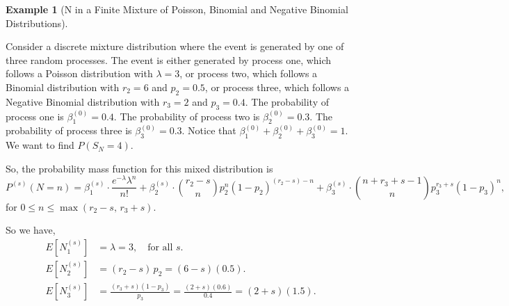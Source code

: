 \documentclass[11pt]{amsart}
\theoremstyle{definition}
\newtheorem{example}{Example}
\theoremstyle{plain}
\begin{document}
\begin{example}[N in a Finite Mixture of Poisson, Binomial and Negative Binomial
Distributions]\label{ex:full-mix}
Consider a discrete mixture distribution where the event is generated by one of three
random processes.  The event is either generated by process one, which follows a Poisson
distribution with $\lambda = 3$, or process two, which follows a Binomial distribution with
$r_2 = 6$ and $p_2 = 0.5$, or process three, which follows a Negative Binomial
distribution with $r_3 = 2$ and $p_3 = 0.4$.  The probability of process one is
$\beta_1^{(0)} = 0.4$.  The probability of process two is $\beta_2^{(0)} = 0.3$.  The
probability of process three is $\beta_3^{(0)} = 0.3$.  Notice that
$\beta_1^{(0)} + \beta_2^{(0)} + \beta_3^{(0)} = 1$.  We want to find $P(S_N = 4)$.

So, the probability mass function for this mixed distribution is
\[
    P^{(s)}(N = n)
    = \beta_1^{(s)} \cdot \frac{e^{-\lambda}\lambda^n}{n!}
    + \beta_2^{(s)} \cdot \binom{r_2 - s}{n} p_2^n(1-p_2)^{(r_2-s)-n}
    + \beta_3^{(s)} \cdot \binom{n + r_3 + s - 1}{n} p_3^{r_3+s}(1-p_3)^n,
\]
for $0 \leq n \leq \max(r_2 - s,\, r_3 + s)$.

So we have,
\begin{align*}
E[N_1^{(s)}] &= \lambda = 3, \quad \text{for all } s. \\
E[N_2^{(s)}] &= (r_2 - s)\,p_2 = (6 - s)(0.5). \\
E[N_3^{(s)}] &= \frac{(r_3 + s)(1-p_3)}{p_3}
    = \frac{(2 + s)(0.6)}{0.4} = (2 + s)(1.5).
\end{align*}


\end{example}
\end{document}
